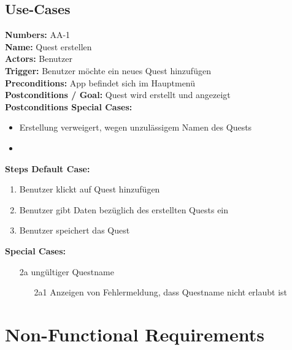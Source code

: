 \documentclass{article}
\begin{document}
\subsection{Use-Cases}

\begin{samepage}
\textbf{Numbers:} AA-1\\
\textbf{Name:} Quest erstellen\\
\textbf{Actors:} Benutzer\\
\textbf{Trigger:} Benutzer möchte ein neues Quest hinzufügen\\
\textbf{Preconditions:}  App befindet sich im Hauptmenü\\
\textbf{Postconditions / Goal:} Quest wird erstellt und angezeigt\\
\textbf{Postconditions Special Cases:}
\begin{itemize}
    \item Erstellung verweigert, wegen unzulässigem Namen des Quests
    \item 
\end{itemize}
\textbf{Steps Default Case:} 
\begin{enumerate}
    \item Benutzer klickt auf Quest hinzufügen
    \item Benutzer gibt Daten bezüglich des erstellten Quests ein 
    \item Benutzer speichert das Quest
\end{enumerate}
\textbf{Special Cases:}
\begin{itemize}
    \item [2a] ungültiger Questname
    \begin{itemize}
        \item [2a1] Anzeigen von Fehlermeldung, dass Questname nicht erlaubt ist
    \end{itemize}
\end{itemize}
\end{samepage}


\section{Non-Functional Requirements}
\end{document}
